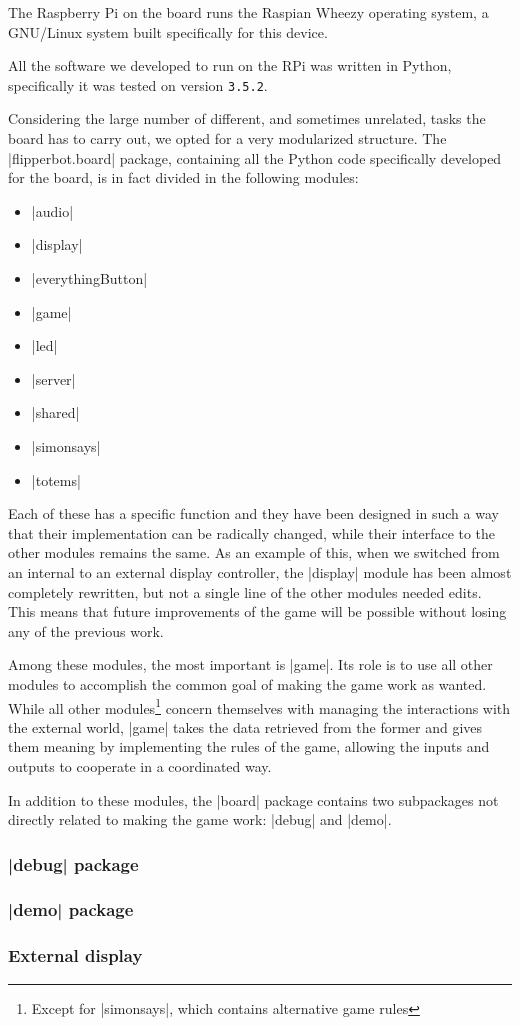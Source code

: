 The Raspberry Pi on the board runs the Raspian Wheezy operating system, a GNU/Linux
system built specifically for this device.

All the software we developed to run on the RPi was written in Python,
specifically it was tested on version \Verb|3.5.2|.

\beforelist* Considering the large number of different, and sometimes unrelated,
tasks the board has to carry out, we opted for a very modularized structure.
The \Code|flipperbot.board| package, containing all the Python code specifically
developed for the board, is in fact divided in the following modules:
\begin{multicols}{2}
\begin{itemize}
  \item \Code|audio|
  \item \Code|display|
  \item \Code|everythingButton|
  \item \Code|game|
  \item \Code|led|
  \item \Code|server|
  \item \Code|shared|
  \item \Code|simonsays|
  \item \Code|totems|
\end{itemize}
\end{multicols}
\afterlist*
Each of these has a specific function and they have been designed in such a way
that their implementation can be radically changed, while their interface to the
other modules remains the same.
As an example of this, when we switched from an internal to an external display controller, the \Code|display| module has been almost completely rewritten, but
not a single line of the other modules needed edits.
This means that future improvements of the game will be possible without losing
any of the previous work.

Among these modules, the most important is \Code|game|.
Its role is to use all other modules to accomplish the common goal of making the
game work as wanted.
While all other modules\footnote{Except for \Code|simonsays|, which contains alternative game rules} concern themselves with managing the interactions with
the external world, \Code|game| takes the data retrieved from the former and
gives them meaning by implementing the rules of the game, allowing the inputs
and outputs to cooperate in a coordinated way.

In addition to these modules, the \Code|board| package contains two subpackages
not directly related to making the game work: \Code|debug| and \Code|demo|. 

\subsubsection[\code{demo} package]{\Code|debug| package}


\subsubsection[\code{demo} package]{\Code|demo| package}


\subsubsection{External display}

